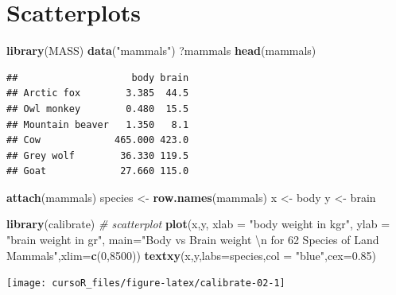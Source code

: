 \documentclass[]{book}
\newenvironment{Shaded}{\begin{snugshade}}{\end{snugshade}}
\newcommand{\KeywordTok}[1]{\textcolor[rgb]{0.13,0.29,0.53}{\textbf{#1}}}
\newcommand{\DataTypeTok}[1]{\textcolor[rgb]{0.13,0.29,0.53}{#1}}
\newcommand{\DecValTok}[1]{\textcolor[rgb]{0.00,0.00,0.81}{#1}}
\newcommand{\FloatTok}[1]{\textcolor[rgb]{0.00,0.00,0.81}{#1}}
\newcommand{\CharTok}[1]{\textcolor[rgb]{0.31,0.60,0.02}{#1}}
\newcommand{\StringTok}[1]{\textcolor[rgb]{0.31,0.60,0.02}{#1}}
\newcommand{\CommentTok}[1]{\textcolor[rgb]{0.56,0.35,0.01}{\textit{#1}}}
\newcommand{\NormalTok}[1]{#1}
\begin{document}
\section{Scatterplots}\label{scatterplots}

\begin{Shaded}
\begin{Highlighting}[]
\KeywordTok{library}\NormalTok{(MASS)}
\KeywordTok{data}\NormalTok{(}\StringTok{"mammals"}\NormalTok{)}
\NormalTok{?mammals}
\KeywordTok{head}\NormalTok{(mammals)}
\end{Highlighting}
\end{Shaded}

\begin{verbatim}
##                    body brain
## Arctic fox        3.385  44.5
## Owl monkey        0.480  15.5
## Mountain beaver   1.350   8.1
## Cow             465.000 423.0
## Grey wolf        36.330 119.5
## Goat             27.660 115.0
\end{verbatim}

\begin{Shaded}
\begin{Highlighting}[]
\KeywordTok{attach}\NormalTok{(mammals)}
\NormalTok{species <-}\StringTok{ }\KeywordTok{row.names}\NormalTok{(mammals)}
\NormalTok{x <-}\StringTok{ }\NormalTok{body}
\NormalTok{y <-}\StringTok{ }\NormalTok{brain}
\end{Highlighting}
\end{Shaded}

\begin{Shaded}
\begin{Highlighting}[]
\KeywordTok{library}\NormalTok{(calibrate)}
\CommentTok{# scatterplot}
\KeywordTok{plot}\NormalTok{(x,y, }\DataTypeTok{xlab =} \StringTok{"body weight in kgr"}\NormalTok{, }\DataTypeTok{ylab =} \StringTok{"brain weight in gr"}\NormalTok{, }
     \DataTypeTok{main=}\StringTok{"Body vs Brain weight }\CharTok{\textbackslash{}n}\StringTok{ for 62 Species of Land Mammals"}\NormalTok{,}\DataTypeTok{xlim=}\KeywordTok{c}\NormalTok{(}\DecValTok{0}\NormalTok{,}\DecValTok{8500}\NormalTok{))}
\KeywordTok{textxy}\NormalTok{(x,y,}\DataTypeTok{labs=}\NormalTok{species,}\DataTypeTok{col =} \StringTok{"blue"}\NormalTok{,}\DataTypeTok{cex=}\FloatTok{0.85}\NormalTok{) }
\end{Highlighting}
\end{Shaded}

\begin{center}\texttt{[image: cursoR\_files/figure-latex/calibrate-02-1]} \end{center}
\end{document}
